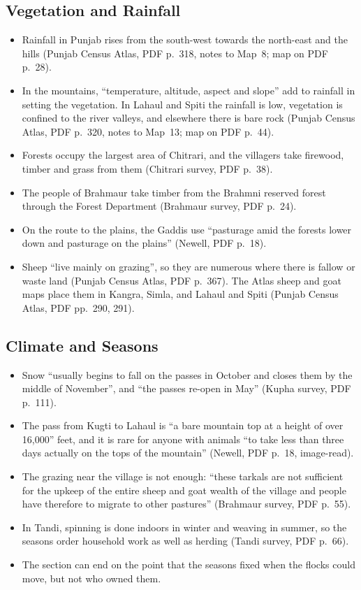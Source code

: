 \documentclass[11pt,a4paper]{article}
\newcommand{\cit}[1]{{\small(#1)}}
\begin{document}
\subsection{Vegetation and Rainfall}
\begin{itemize}
\item Rainfall in Punjab rises from the south-west towards the north-east and
  the hills \cit{Punjab Census Atlas, PDF p.~318, notes to Map~8; map on PDF
  p.~28}.
\item In the mountains, \enquote{temperature, altitude, aspect and slope} add
  to rainfall in setting the vegetation. In Lahaul and Spiti the rainfall is
  low, vegetation is confined to the river valleys, and elsewhere there is bare
  rock \cit{Punjab Census Atlas, PDF p.~320, notes to Map~13; map on PDF
  p.~44}.
\item Forests occupy the largest area of Chitrari, and the villagers take
  firewood, timber and grass from them \cit{Chitrari survey, PDF p.~38}.
\item The people of Brahmaur take timber from the Brahmni reserved forest
  through the Forest Department \cit{Brahmaur survey, PDF p.~24}.
\item On the route to the plains, the Gaddis use \enquote{pasturage amid the
  forests lower down and pasturage on the plains} \cit{Newell, PDF p.~18}.
\item Sheep \enquote{live mainly on grazing}, so they are numerous where there
  is fallow or waste land \cit{Punjab Census Atlas, PDF p.~367}. The Atlas
  sheep and goat maps place them in Kangra, Simla, and Lahaul and Spiti
  \cit{Punjab Census Atlas, PDF pp.~290, 291}.
\end{itemize}

\subsection{Climate and Seasons}
\begin{itemize}
\item Snow \enquote{usually begins to fall on the passes in October and closes
  them by the middle of November}, and \enquote{the passes re-open in May}
  \cit{Kupha survey, PDF p.~111}.
\item The pass from Kugti to Lahaul is \enquote{a bare mountain top at a height
  of over 16,000} feet, and it is rare for anyone with animals \enquote{to take
  less than three days actually on the tops of the mountain} \cit{Newell, PDF
  p.~18, image-read}.
\item The grazing near the village is not enough: \enquote{these tarkals are
  not sufficient for the upkeep of the entire sheep and goat wealth of the
  village and people have therefore to migrate to other pastures}
  \cit{Brahmaur survey, PDF p.~55}.
\item In Tandi, spinning is done indoors in winter and weaving in summer, so
  the seasons order household work as well as herding \cit{Tandi survey, PDF
  p.~66}.
\item The section can end on the point that the seasons fixed when the flocks
  could move, but not who owned them.
\end{itemize}
\end{document}
